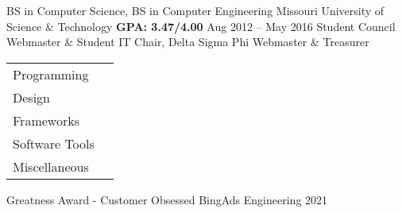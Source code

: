 \documentclass[]{awesome-cv}
\begin{document}
\vspace*{0mm}

\begin{cventries}
	\cventry
	{BS in Computer Science, BS in Computer Engineering}
	{Missouri University of Science \& Technology}
	{\bfseries GPA: 3.47/4.00}
	{Aug 2012 – May 2016}
	{Student Council Webmaster \& Student IT Chair, Delta Sigma Phi Webmaster \& Treasurer} %
\end{cventries}

\vspace*{0mm}

\begin{cventries}
	\cventry
	{\def\arraystretch{1.5}{\begin{tabular}{ l l}
		Programming  & {\skill{ JS/Typescript, C\#, C++, T-SQL}} \\
		Design  & {\skill{ HTML, CSS, Markdown, \LaTeX}} \\
		Frameworks  & {\skill{ React, Redux, Knockout, web components}} \\
		Software Tools  & {\skill{ Git, Powershell, Bash}} \\
		Miscellaneous  & {\skill{ MS Office, Android, Windows, Linux, Azure DevOps, GitHub}} \\
		\end{tabular}}}
	{}
	{}
	{}
	{}
\end{cventries}
\vspace{-6mm}

\begin{cvhonors}
	\cvhonor
	{Greatness Award - Customer Obsessed}
	{BingAds Engineering}
	{}
	{2021}
\end{cvhonors}
\end{document}
